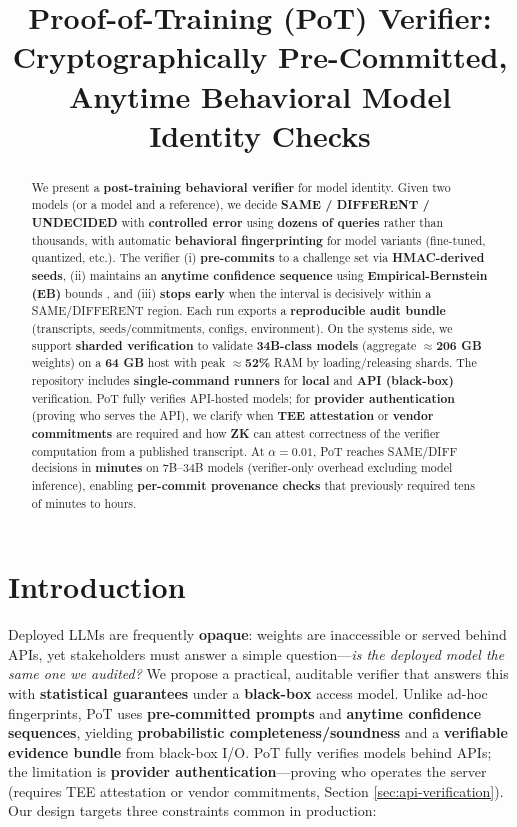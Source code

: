 \documentclass{article}
\title{Proof-of-Training (PoT) Verifier: Cryptographically Pre-Committed,\\
Anytime Behavioral Model Identity Checks}
\date{}
\begin{document}
\maketitle

\begin{abstract}
We present a \textbf{post-training behavioral verifier} for model identity. Given two models (or a model and a reference), we decide \textbf{SAME / DIFFERENT / UNDECIDED} with \textbf{controlled error} using \textbf{dozens of queries} rather than thousands, with automatic \textbf{behavioral fingerprinting} for model variants (fine-tuned, quantized, etc.). The verifier (i) \textbf{pre-commits} to a challenge set via \textbf{HMAC-derived seeds}, (ii) maintains an \textbf{anytime confidence sequence} using \textbf{Empirical-Bernstein (EB)} bounds \cite{maurer2009empiricalbernstein,howard2021timeuniform,howard2021confidenceSequences}, and (iii) \textbf{stops early} when the interval is decisively within a SAME/DIFFERENT region. Each run exports a \textbf{reproducible audit bundle} (transcripts, seeds/commitments, configs, environment). On the systems side, we support \textbf{sharded verification} to validate \textbf{34B-class models} (aggregate $\approx$\textbf{206 GB} weights) on a \textbf{64 GB} host with peak $\approx$\textbf{52\%} RAM by loading/releasing shards. The repository includes \textbf{single-command runners} for \textbf{local} and \textbf{API (black-box)} verification. PoT fully verifies API-hosted models; for \textbf{provider authentication} (proving who serves the API), we clarify when \textbf{TEE attestation} or \textbf{vendor commitments} are required and how \textbf{ZK} can attest correctness of the verifier computation from a published transcript. At $\alpha=0.01$, PoT reaches SAME/DIFF decisions in \textbf{minutes} on 7B--34B models (verifier-only overhead excluding model inference), enabling \textbf{per-commit provenance checks} that previously required tens of minutes to hours.
\end{abstract}

\section{Introduction}

Deployed LLMs are frequently \textbf{opaque}: weights are inaccessible or served behind APIs, yet stakeholders must answer a simple question---\emph{is the deployed model the same one we audited?} We propose a practical, auditable verifier that answers this with \textbf{statistical guarantees} under a \textbf{black-box} access model. Unlike ad-hoc fingerprints, PoT uses \textbf{pre-committed prompts} and \textbf{anytime confidence sequences}, yielding \textbf{probabilistic completeness/soundness} and a \textbf{verifiable evidence bundle} from black-box I/O. PoT fully verifies models behind APIs; the limitation is \textbf{provider authentication}---proving who operates the server (requires TEE attestation or vendor commitments, Section \ref{sec:api-verification}). Our design targets three constraints common in production:
\end{document}
